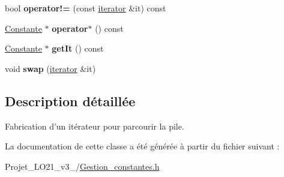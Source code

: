 \begin{DoxyCompactItemize}
\item 
\hypertarget{class_stack_1_1iterator_a51e29caedfcff04927f50629275d6b79}{bool {\bfseries operator!=} (const \hyperlink{class_stack_1_1iterator}{iterator} \&it) const }\label{class_stack_1_1iterator_a51e29caedfcff04927f50629275d6b79}

\item 
\hypertarget{class_stack_1_1iterator_ad0c0d548f2189cf62d44a9b9e1860b88}{\hyperlink{class_calcul_1_1_constante}{Constante} $\ast$ {\bfseries operator$\ast$} () const }\label{class_stack_1_1iterator_ad0c0d548f2189cf62d44a9b9e1860b88}

\item 
\hypertarget{class_stack_1_1iterator_a29db2d0193cf47fb1d12e50c7219b355}{\hyperlink{class_calcul_1_1_constante}{Constante} $\ast$ {\bfseries get\-It} () const }\label{class_stack_1_1iterator_a29db2d0193cf47fb1d12e50c7219b355}

\item 
\hypertarget{class_stack_1_1iterator_a968852ab69c70d5529c931bf61d6c2c1}{void {\bfseries swap} (\hyperlink{class_stack_1_1iterator}{iterator} \&it)}\label{class_stack_1_1iterator_a968852ab69c70d5529c931bf61d6c2c1}

\end{DoxyCompactItemize}


\subsection{Description détaillée}
Fabrication d'un itérateur pour parcourir la pile. 

La documentation de cette classe a été générée à partir du fichier suivant \-:\begin{DoxyCompactItemize}
\item 
Projet\-\_\-\-L\-O21\-\_\-v3\-\_/\hyperlink{_gestion__constantes_8h}{Gestion\-\_\-constantes.\-h}\end{DoxyCompactItemize}
